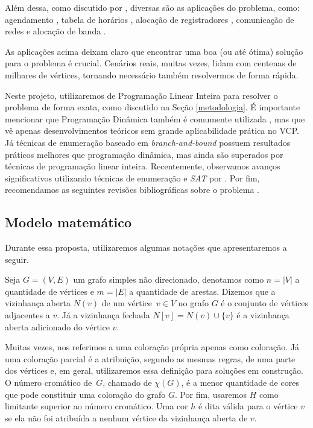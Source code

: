\documentclass[11pt]{article}
\begin{document}
Além dessa, como discutido por \textcite{Malaguti2010surveyvertexcoloring}, diversas são as aplicações do problema, como: agendamento \autocite{Leighton1979GraphColoringAlgorithm}, tabela de horários \autocite{Werra1985introductiontimetabling}, alocação de registradores \autocite{Chow1990prioritybasedcoloring}, comunicação de redes \autocite{Caprara2007PassengerRailwayOptimization} e alocação de banda \autocite{Gamst1986Somelowerbounds}.

As aplicações acima deixam claro que encontrar uma boa (ou até ótima) solução para o problema é crucial.
Cenários reais, muitas vezes, lidam com centenas de milhares de vértices, tornando necessário também resolvermos de forma rápida.

Neste projeto, utilizaremos de Programação Linear Inteira para resolver o problema de forma exata, como discutido na Seção \ref{metodologia}.
É importante mencionar que Programação Dinâmica também é comumente utilizada \autocites{Eppstein2006SmallMaximalIndependent}[][]{Byskov2002ChromaticNumberTime}, mas que vê apenas desenvolvimentos teóricos sem grande aplicabilidade prática no VCP.
Já técnicas de enumeração baseado em \emph{branch-and-bound} \autocite{Brelaz1979Newmethodscolor} possuem resultados práticos melhores que programação dinâmica, mas ainda são superados por técnicas de programação linear inteira.
Recentemente, observamos avanços significativos utilizando técnicas de enumeração e \emph{SAT} por \textcite{Hebrard2020ConstraintSatisfiabilityReasoning}.
Por fim, recomendamos as seguintes revisões bibliográficas sobre o problema  \autocites{Malaguti2010surveyvertexcoloring}[][]{Lewis2015GuideGraphColouring}[][]{Husfeldt2015Graphcolouringalgorithms}[][]{Lima2018ExactAlgorithmsGraph}.

\subsection{Modelo matemático}
\label{sec:org85c73d0}
Durante essa proposta, utilizaremos algumas notações que apresentaremos a seguir.

Seja \(G = (V,E)\) um grafo simples não direcionado, denotamos como \(n = |V|\) a quantidade de vértices e \(m = |E|\) a quantidade de arestas.
Dizemos que a vizinhança aberta \(N(v)\) de um vértice~\(v \in V\) no grafo \(G\) é o conjunto de vértices adjacentes a \(v\).
Já a vizinhança fechada \(N[v] = N(v) \cup \{v\}\) é a vizinhança aberta adicionado do vértice \(v\).

Muitas vezes, nos referimos a uma coloração própria apenas como coloração.
Já uma coloração parcial é a atribuição, segundo as mesmas regras, de uma parte dos vértices e, em geral, utilizaremos essa definição para soluções em construção.
O número cromático de~\(G\), chamado de \(\chi(G)\), é a menor quantidade de cores que pode constituir uma coloração do grafo \(G\).
Por fim, usaremos \(H\) como limitante superior ao número cromático.
Uma cor \(h\) é dita válida para o vértice \(v\) se ela não foi atribuída a nenhum vértice da vizinhança aberta de \(v\).
\end{document}
